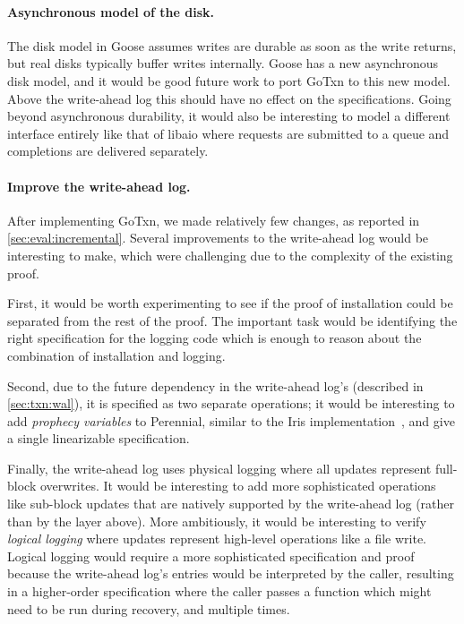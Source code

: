 \paragraph{Asynchronous model of the disk.} The disk model in Goose assumes
writes are durable as soon as the write returns, but real disks typically buffer
writes internally. Goose has a new asynchronous disk model,
and it would be good future work to port GoTxn to
this new model. Above the write-ahead log this should have no effect on the
specifications. Going beyond asynchronous durability, it would also be
interesting to model a different interface entirely like that of libaio where
requests are submitted to a queue and completions are delivered separately.

\paragraph{Improve the write-ahead log.} After implementing GoTxn, we made
relatively few changes, as reported in \cref{sec:eval:incremental}. Several
improvements to the write-ahead log would be interesting to make, which were
challenging due to the complexity of the existing proof.

First, it would be worth experimenting to see if the proof of installation could
be separated from the rest of the proof. The important task would be identifying
the right specification for the logging code which is enough to reason about the
combination of installation and logging.

Second, due to the future dependency in the write-ahead log's 
(described in \cref{sec:txn:wal}), it is specified as two separate
operations; it would be interesting to add \emph{prophecy variables} to
Perennial, similar to the Iris implementation~\cite{jung:prophecy}, and give
 a single linearizable specification.

Finally, the write-ahead log uses physical logging where all updates represent
full-block overwrites. It would be interesting to add more sophisticated
operations like sub-block updates that are natively supported by the write-ahead
log (rather than by the layer above). More ambitiously, it would be interesting
to verify \emph{logical logging} where updates represent high-level operations
like a file write. Logical logging would require a more sophisticated
specification and proof because the write-ahead log's entries would be
interpreted by the caller, resulting in a higher-order specification where the
caller passes a function which might need to be run during recovery, and
multiple times.

